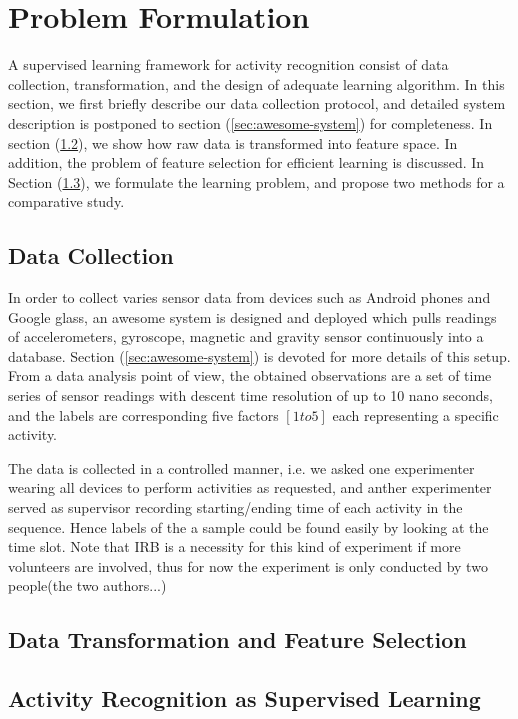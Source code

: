 
\section{Problem Formulation}
\label{sec:problem-formulation}

A supervised learning framework for activity recognition consist of data collection, transformation, and the design of adequate learning algorithm. In this section, we first briefly describe our data collection protocol, and detailed system description is postponed to section (\ref{sec:awesome-system}) for completeness. In section (\ref{subsec: data-transform}), we show how raw data is transformed into feature space. In addition, the problem of feature selection  for efficient learning is discussed. In Section (\ref{subsec: learning}), we formulate the learning problem, and propose two methods for a comparative study.  

\subsection{Data Collection}
\label{subsec: data-collection}
In order to collect varies sensor data from devices such as Android phones and Google glass, an awesome system is designed and deployed which pulls readings of accelerometers, gyroscope, magnetic and gravity sensor continuously into a database. Section (\ref{sec:awesome-system}) is devoted for more details of this setup. From a data analysis point of view, the obtained observations are a set of time series of sensor readings with descent time resolution of up to 10 nano seconds, and the labels are corresponding five factors $[1 to 5]$ each representing a specific activity.

The data is collected in a controlled manner, i.e. we asked one experimenter wearing all devices to perform activities as requested, and anther experimenter served as supervisor recording starting/ending time of each activity in the sequence. Hence labels of the a sample could be found easily by looking at the time slot. Note that IRB is a necessity for this kind of experiment if more volunteers are involved, thus for now the experiment is only conducted by two people(the two authors...) 

\subsection{Data Transformation and Feature Selection}
\label{subsec: data-transform}


\subsection{Activity Recognition as Supervised Learning}
\label{subsec: learning}

